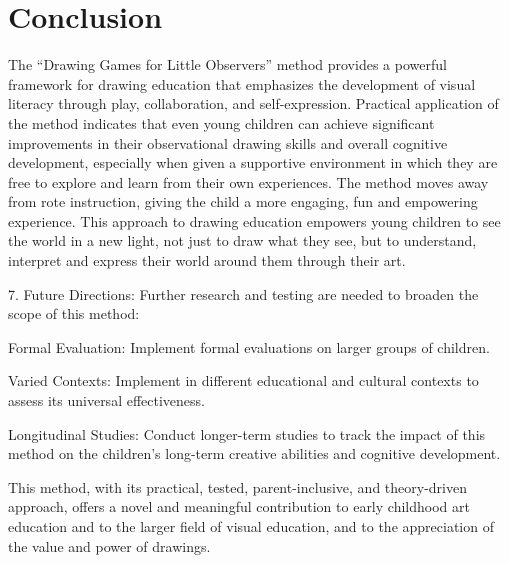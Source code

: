 \documentclass{article}
\begin{document}
\section{Conclusion}

The “Drawing Games for Little Observers” method provides a powerful framework for drawing education that emphasizes the development of visual literacy through play, collaboration, and self-expression. Practical application of the method indicates that even young children can achieve significant improvements in their observational drawing skills and overall cognitive development, especially when given a supportive environment in which they are free to explore and learn from their own experiences. The method moves away from rote instruction, giving the child a more engaging, fun and empowering experience.
This approach to drawing education empowers young children to see the world in a new light, not just to draw what they see, but to understand, interpret and express their world around them through their art.

7. Future Directions:
Further research and testing are needed to broaden the scope of this method:

Formal Evaluation: Implement formal evaluations on larger groups of children.

Varied Contexts: Implement in different educational and cultural contexts to assess its universal effectiveness.

Longitudinal Studies: Conduct longer-term studies to track the impact of this method on the children’s long-term creative abilities and cognitive development.

This method, with its practical, tested, parent-inclusive, and theory-driven approach, offers a novel and meaningful contribution to early childhood art education and to the larger field of visual education, and to the appreciation of the value and power of drawings.





\end{document}
